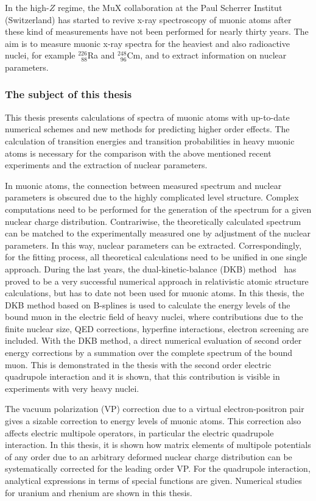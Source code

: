 In the high-$Z$ regime, the MuX collaboration at the Paul Scherrer Institut (Switzerland) has started to revive x-ray spectroscopy of muonic atoms after these kind of measurements have not been performed for nearly thirty years.
The aim is to measure muonic x-ray spectra for the heaviest and also radioactive nuclei, for example $^{226}_{\phantom{1}88}$Ra and $^{248}_{\phantom{1}96}$Cm, and to extract information on nuclear parameters. 

\subsubsection*{The subject of this thesis}

This thesis presents calculations of spectra of muonic atoms with up-to-date numerical schemes and new methods for predicting higher order effects.
The calculation of transition energies and transition probabilities in heavy muonic atoms is necessary for the comparison with the above mentioned recent experiments and the extraction of nuclear parameters.

In muonic atoms, the connection between measured spectrum and nuclear parameters is obscured due to the highly complicated level structure. Complex computations need to be performed for the generation of the spectrum for a given nuclear charge distribution. Contrariwise, the theoretically calculated spectrum can be matched to the experimentally measured one by adjustment of the nuclear parameters. In this way, nuclear parameters can be extracted. Correspondingly, for the fitting process, all theoretical calculations need to be unified in one single approach. 
During the last years, the dual-kinetic-balance (DKB) method~\cite{Shabaev2004} has proved to be a very successful numerical approach in relativistic atomic structure calculations, but has to date not been used for muonic atoms.
In this thesis, the DKB method based on B-splines is used to calculate the energy levels of the bound muon in the electric field of heavy nuclei, where contributions due to the finite nuclear size, QED corrections, hyperfine interactions, electron screening are included.
With the DKB method, a direct numerical evaluation of second order energy corrections by a summation over the complete spectrum of the bound muon. This is demonstrated in the thesis with the second order electric quadrupole interaction and it is shown, that this contribution is visible in experiments with very heavy nuclei.

The vacuum polarization (VP) correction due to a virtual electron-positron pair gives a sizable correction to energy levels of muonic atoms. This correction also affects electric multipole operators, in particular the electric quadrupole interaction. In this thesis, it is shown how matrix elements of multipole potentials of any order due to an arbitrary deformed nuclear charge distribution can be systematically corrected for the leading order VP. For the quadrupole interaction, analytical expressions in terms of special functions are given.  Numerical studies for uranium and rhenium are shown in this thesis.

